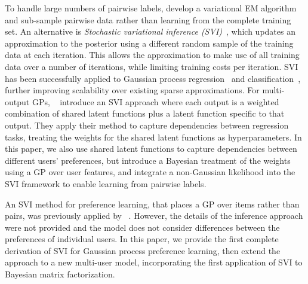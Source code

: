 To handle large numbers of pairwise labels, \citet{khan2014scalable}
develop a variational EM algorithm and sub-sample pairwise data rather than learning from the complete training set.
An alternative is \emph{Stochastic variational inference (SVI)}~\citep{hoffman2013stochastic}, which updates an approximation to the posterior using 
 a different random sample of the training data at each iteration. 
 This allows the approximation to make use of all training data over a number of 
 iterations, while limiting training costs per iteration.
SVI has been successfully applied to Gaussian process regression~\citep{hensman2013gaussian} and classification~\citep{hensman2015scalable},
further improving scalability over existing sparse approximations.
For multi-output GPs, ~\citet{nguyen2014collaborative} introduce an SVI approach where 
each output is a weighted combination of shared latent functions plus a latent function specific to that output. 
They apply their method to capture dependencies between regression tasks,
treating the weights for the shared latent functions as hyperparameters. 
In this paper, we also use shared latent functions to capture dependencies between different users' preferences,
but introduce a Bayesian treatment of the weights using a GP over user features,
and integrate a non-Gaussian likelihood into the SVI framework to enable learning from pairwise labels.

 An SVI method for preference learning,
 that places a GP over items rather than pairs, was previously applied by ~\citet{simpson2018finding}.
 However, the details of the inference approach were not provided and the model does not consider
 differences between the preferences of individual users.
In this paper, we provide the first complete derivation of SVI for Gaussian process preference learning,
then extend the approach to a new multi-user model, 
incorporating the first application of SVI to Bayesian matrix factorization.

